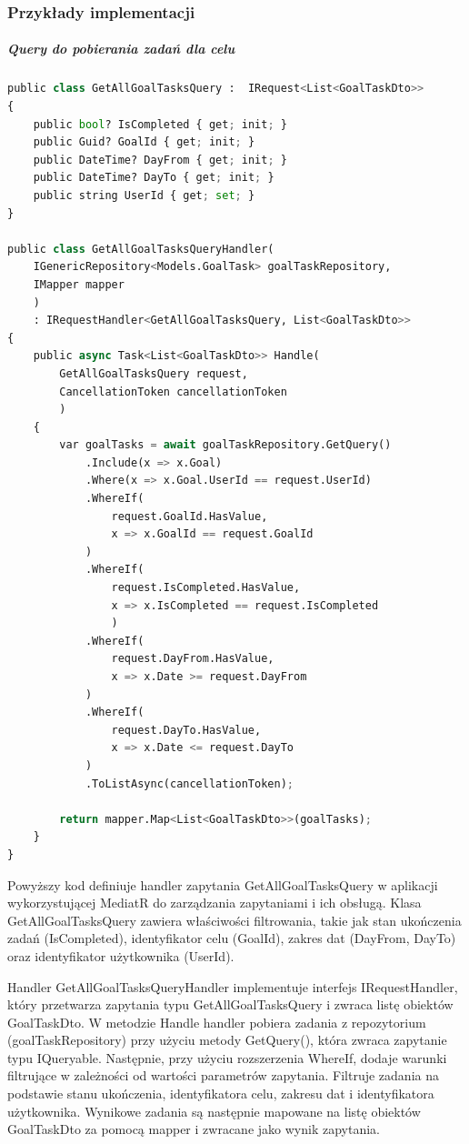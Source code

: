 \subsubsection{Przykłady implementacji}
\subparagraph{Query do pobierania zadań dla celu}
\begin{lstlisting}[language=Python, caption=Pobieranie listy zadań dla celu, linewidth=160mm]
public class GetAllGoalTasksQuery :  IRequest<List<GoalTaskDto>>
{
    public bool? IsCompleted { get; init; }
    public Guid? GoalId { get; init; }
    public DateTime? DayFrom { get; init; }
    public DateTime? DayTo { get; init; }
    public string UserId { get; set; }
}

public class GetAllGoalTasksQueryHandler(
    IGenericRepository<Models.GoalTask> goalTaskRepository, 
    IMapper mapper
    )
    : IRequestHandler<GetAllGoalTasksQuery, List<GoalTaskDto>>
{
    public async Task<List<GoalTaskDto>> Handle(
        GetAllGoalTasksQuery request, 
        CancellationToken cancellationToken
        )
    {
        var goalTasks = await goalTaskRepository.GetQuery()
            .Include(x => x.Goal)
            .Where(x => x.Goal.UserId == request.UserId)
            .WhereIf(
                request.GoalId.HasValue, 
                x => x.GoalId == request.GoalId
            )
            .WhereIf(
                request.IsCompleted.HasValue, 
                x => x.IsCompleted == request.IsCompleted
                )
            .WhereIf(
                request.DayFrom.HasValue, 
                x => x.Date >= request.DayFrom
            )
            .WhereIf(
                request.DayTo.HasValue, 
                x => x.Date <= request.DayTo
            )
            .ToListAsync(cancellationToken);

        return mapper.Map<List<GoalTaskDto>>(goalTasks);
    }
}
\end{lstlisting}
Powyższy kod definiuje handler zapytania GetAllGoalTasksQuery w aplikacji wykorzystującej MediatR do zarządzania zapytaniami i ich obsługą. Klasa GetAllGoalTasksQuery zawiera właściwości filtrowania, takie jak stan ukończenia zadań (IsCompleted), identyfikator celu (GoalId), zakres dat (DayFrom, DayTo) oraz identyfikator użytkownika (UserId).

Handler GetAllGoalTasksQueryHandler implementuje interfejs IRequestHandler, który przetwarza zapytania typu GetAllGoalTasksQuery i zwraca listę obiektów GoalTaskDto. W metodzie Handle handler pobiera zadania z repozytorium (goalTaskRepository) przy użyciu metody GetQuery(), która zwraca zapytanie typu IQueryable. Następnie, przy użyciu rozszerzenia WhereIf, dodaje warunki filtrujące w zależności od wartości parametrów zapytania. Filtruje zadania na podstawie stanu ukończenia, identyfikatora celu, zakresu dat i identyfikatora użytkownika. Wynikowe zadania są następnie mapowane na listę obiektów GoalTaskDto za pomocą mapper i zwracane jako wynik zapytania.

